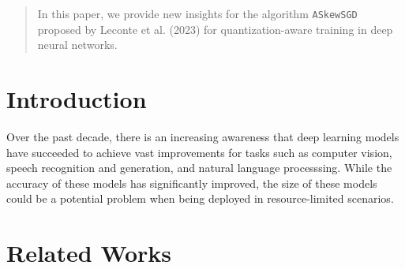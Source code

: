 \documentclass[twoside]{article}
\begin{document}
%

%


\begin{abstract}
  In this paper, we provide new insights for the algorithm \texttt{ASkewSGD} proposed by Leconte et al. (2023) for quantization-aware training in deep neural networks.
\end{abstract}

\section{Introduction}

Over the past decade, there is an increasing awareness that deep learning models have succeeded to achieve vast improvements for tasks such as computer vision, speech recognition and generation, and natural language processsing. While the accuracy of these models has significantly improved, the size of these models could be a potential problem when being deployed in resource-limited scenarios.

\section{Related Works}
\end{document}
